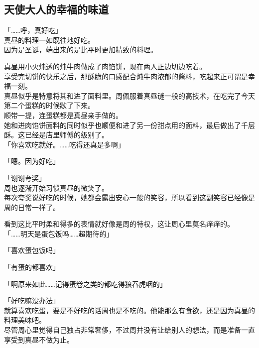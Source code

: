 \subsection{天使大人的幸福的味道}

「……呼，真好吃」\\

真昼的料理一如既往地好吃。\\

因为是圣诞，端出来的是比平时更加精致的料理。

真昼用小火炖透的炖牛肉做成了肉馅饼，现在两人正边切边吃着。\\

享受完切饼的快乐之后，那酥脆的口感配合炖牛肉浓郁的酱料，吃起来正可谓是幸福一刻。\\

真昼似乎是特意将其和进了面料里。周佩服着真昼谜一般的高技术，在吃完了今天第二个蛋糕的时候歇了下来。\\

顺带一提，连蛋糕都是真昼亲手做的。\\

她和进肉馅饼面料的同时似乎也顺便和进了另一份甜点用的面料，最后做出了千层酥。这已经是店里师傅的级别了。\\

「你喜欢吃就好。……吃得还真是多啊」

「嗯。因为好吃」

「谢谢夸奖」\\

周也逐渐开始习惯真昼的微笑了。\\

每次夸奖说好吃的时候，她都会露出安心一般的笑容，所以看到这副笑容已经像是周的日常一样了。

看到这比平时柔和得多的表情就好像是周的特权，这让周心里莫名痒痒的。\\

「……明天是蛋包饭吗……超期待的」

「喜欢蛋包饭吗」

「有蛋的都喜欢」

「啊原来如此……记得蛋卷之类的都吃得狼吞虎咽的」

「好吃嘛没办法」\\

就算喜欢吃蛋，要是不好吃的话周也是不吃的。他能那么有食欲，还是因为真昼的料理美味吧。\\

尽管周心里觉得自己独占非常奢侈，不过周并没有让给别人的想法，而是准备一直享受到真昼不做为止。\\

